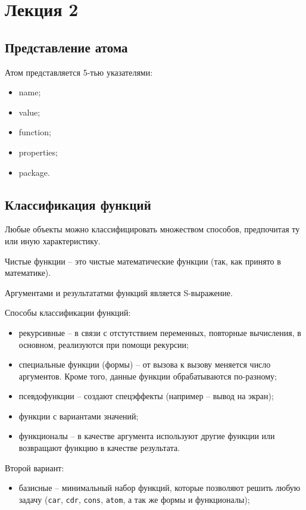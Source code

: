 \chapter{Лекция 2}

\section{Представление атома}

Атом представляется 5-тью указателями:
\begin{itemize}
    \item name;
    \item value;
    \item function;
    \item properties;
    \item package.
\end{itemize}

\section{Классификация функций}

Любые объекты можно классифицировать множеством способов, предпочитая ту или иную характеристику.

Чистые функции -- это чистые математические функции (так, как принято в математике).

Аргументами и результататми функций является S-выражение.

Способы классификации функций:
\begin{itemize}
    \item рекурсивные -- в связи с отстутствием переменных, повторные вычисления, в основном, реализуются при помощи рекурсии;
    \item специальные функции (формы) -- от вызова к вызову меняется число аргументов. Кроме того, данные функции обрабатываются по-разному;
    \item псевдофункции -- создают спецэффекты (например -- вывод на экран);
    \item функции с вариантами значений;
    \item функционалы -- в качестве аргумента используют другие функции или возвращают функцию в качестве результата.
\end{itemize}

Второй вариант:
\begin{itemize}
    \item базисные -- минимальный набор функций, которые позволяют решить любую задачу (\texttt{car}, \texttt{cdr}, \texttt{cons}, \texttt{atom}, а так же формы и функционалы);
\end{itemize}

